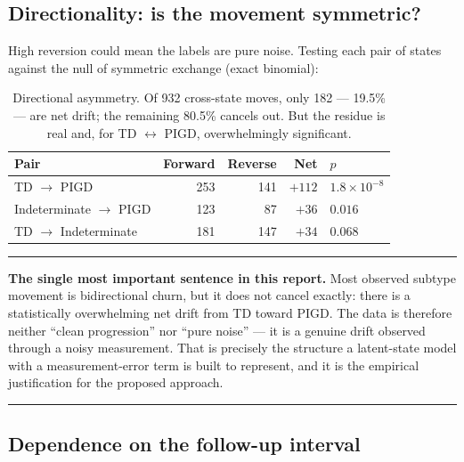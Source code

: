 \documentclass[11pt,a4paper]{article}
\newenvironment{keypoint}
  {\begin{center}\begin{minipage}{0.94\textwidth}%
   \vspace{4pt}\hrule\vspace{7pt}\small}
  {\vspace{7pt}\hrule\vspace{4pt}\end{minipage}\end{center}}
\begin{document}
\subsection{Directionality: is the movement symmetric?}

High reversion could mean the labels are pure noise. Testing each pair of
states against the null of symmetric exchange (exact binomial):

\begin{table}[htbp]
\centering
\begin{tabular}{@{}lrrrl@{}}
\toprule
\textbf{Pair} & \textbf{Forward} & \textbf{Reverse} & \textbf{Net} & \textbf{$p$} \\
\midrule
TD $\rightarrow$ PIGD          & 253 & 141 & $+112$ & $1.8\times10^{-8}$ \\
Indeterminate $\rightarrow$ PIGD & 123 &  87 & $+36$  & $0.016$ \\
TD $\rightarrow$ Indeterminate & 181 & 147 & $+34$  & $0.068$ \\
\bottomrule
\end{tabular}
\caption{Directional asymmetry. Of 932 cross-state moves, only 182 --- 19.5\%
--- are net drift; the remaining 80.5\% cancels out. But the residue is real
and, for TD $\leftrightarrow$ PIGD, overwhelmingly significant.}
\label{tab:symmetry}
\end{table}

\begin{keypoint}
\textbf{The single most important sentence in this report.} Most observed
subtype movement is bidirectional churn, but it does not cancel exactly: there
is a statistically overwhelming net drift from TD toward PIGD. The data is
therefore neither ``clean progression'' nor ``pure noise'' --- it is a genuine
drift observed through a noisy measurement. That is precisely the structure a
latent-state model with a measurement-error term is built to represent, and it
is the empirical justification for the proposed approach.
\end{keypoint}

\subsection{Dependence on the follow-up interval}
\end{document}

